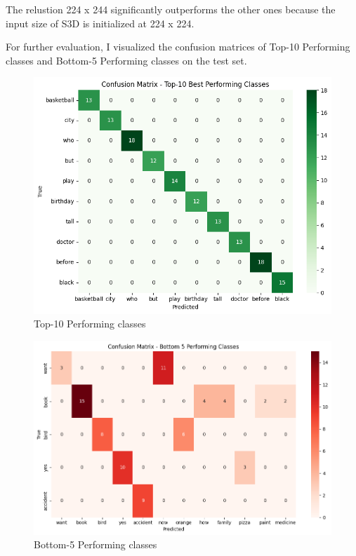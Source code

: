 \documentclass{article}
\begin{document}
The relustion 224 x 244 significantly outperforms the other ones because the input size of S3D is initialized at 224 x 224.

\vspace{0.5cm}

For further evaluation, I visualized the confusion matrices of Top-10 Performing classes and Bottom-5 Performing classes on the test set.

\begin{figure}[h]
    \centering
    \includegraphics[width=0.85\linewidth]{Fig/top10-acc.png}
    \caption{Top-10 Performing classes}
    \label{fig:top10}
\end{figure}

\begin{figure}[H]
    \centering
    \includegraphics[width=0.9\linewidth]{Fig/bottom5-acc.png}
    \caption{Bottom-5 Performing classes}
    \label{fig:bottom5}
\end{figure}
\end{document}
